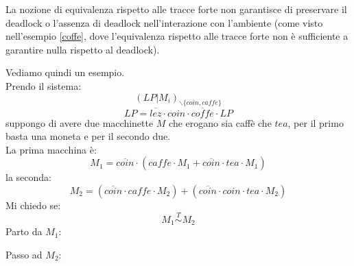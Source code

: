\begin{definizione}
  La nozione di equivalenza rispetto alle tracce forte non garantisce di
  preservare il deadlock o l'assenza di deadlock nell'interazione con l'ambiente
  (come visto nell'esempio \ref{coffe}, dove l'equivalenza rispetto alle tracce
  forte non è sufficiente a garantire nulla rispetto al deadlock).
\end{definizione}
\begin{esempio}
  Vediamo quindi un esempio.\\
  Prendo il sistema:
  \[(LP|M_i)_{\backslash\{coin, caffe\}}\]
  \[LP=\overline{lez}\cdot coin\cdot \overline{coffe}\cdot LP\]
  suppongo di avere due macchinette $M$ che erogano sia caffè che $tea$, per il
  primo basta una moneta e per il secondo due.\\
  La prima macchina è:
  \[M_1=\overline{coin}\cdot(caffe\cdot M_1+\overline{coin}\cdot tea\cdot M_1)\]
  la seconda:
  \[M_2=(\overline{coin}\cdot caffe\cdot M_2)+(\overline{coin}\cdot coin \cdot
    tea\cdot M_2)\]
  Mi chiedo se:
  \[M_1\stackrel{T}{\sim} M_2\]
  Parto da $M_1$:
  \begin{center}
  \end{center}
  Passo ad $M_2$:
   \begin{center}
\end{center}
\end{esempio}
